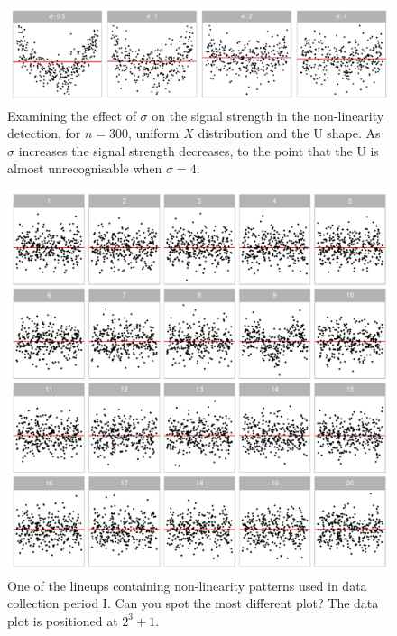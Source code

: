 \documentclass[]{interact}
\theoremstyle{plain}%
\theoremstyle{definition}
\theoremstyle{remark}
\begin{document}
\begin{figure}

{\centering \includegraphics[width=1\linewidth]{paper_comparison_files/figure-latex/different-sigma-1} 

}

\caption{Examining the effect of $\sigma$ on the signal strength in the non-linearity detection, for $n=300$, uniform $X$ distribution and the U shape. As $\sigma$ increases the signal strength decreases, to the point that the U is almost unrecognisable when $\sigma=4$.}\label{fig:different-sigma}
\end{figure}

\begin{figure}

{\centering \includegraphics[width=1\linewidth]{paper_comparison_files/figure-latex/example-poly-lineup-1} 

}

\caption{One of the lineups containing non-linearity patterns used in data collection period I. Can you spot the most different plot? The data plot is positioned at $2^3 + 1$.}\label{fig:example-poly-lineup}
\end{figure}
\end{document}
